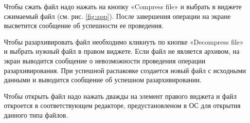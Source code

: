 Чтобы сжать файл надо нажать на кнопку «Compress file» и выбрать в виджете сжимаемый файл (см. рис. \ref{fig:app}).
После завершения операции на экране высветится сообщение об успешности ее проведения.



Чтобы разархивировать файл необходимо кликнуть по кнопке «Decompress file» и выбрать нужный файл в правом виджете.
Если файл не является архивом, на экран выводится сообщение о невозможности проведения операции разархивирования.
При успешной распаковке создается новый файл с исходными данными и выводится сообщение об успешном разархивировании.



Чтобы открыть файл надо нажать дважды на элемент правого виджета и файл откроется в соответствующем редакторе, предустановленом в ОС для открытия данного типа файлов.